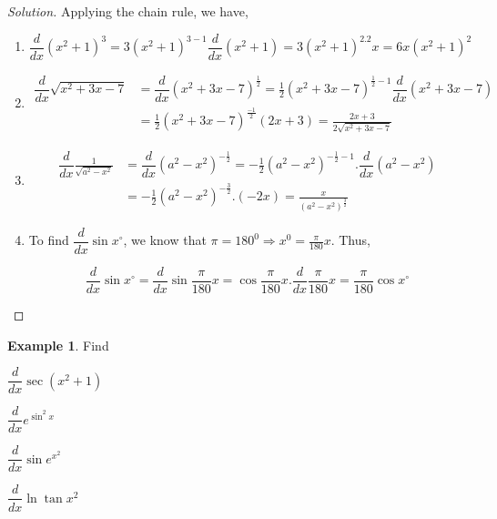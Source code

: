 \documentclass[../../main.tex]{subfiles}
\theoremstyle{definition}
\newtheorem{example}{Example}[section]
\newenvironment{solution}
    {\begin{proof}[Solution]}
    {\end{proof}}
\begin{document}
\begin{solution}
Applying the chain rule, we have,
\begin{enumerate}[label=(\roman*)]
\item 
\[
\dfrac{d}{dx} (x^2+1)^3 = 3(x^2+1)^{3-1} \dfrac{d}{dx}(x^2+1) = 3(x^2+1)^2.2x = 6x(x^2+1)^2
\]

\item 
\begin{align*}
\dfrac{d}{dx} \sqrt{{x^2+3x-7}} &= \dfrac{d}{dx} {(x^2+3x-7)^{\frac{1}{2}}} = \frac{1}{2}(x^2+3x-7)^{\frac{1}{2}-1}\dfrac{d}{dx}(x^2+3x-7) \\
&= \frac{1}{2}(x^2+3x-7)^{\frac{-1}{2}}(2x+3) = \frac{2x+3}{2\sqrt{x^2+3x-7}}
\end{align*}

\item \begin{align*}
\dfrac{d}{dx} \frac{1}{\sqrt{a^2-x^2}} &= \dfrac{d}{dx}(a^2-x^2)^{-\frac{1}{2}} = -\frac{1}{2}(a^2-x^2)^{-\frac{1}{2}-1}.\dfrac{d}{dx}(a^2-x^2) \\
&= -\frac{1}{2}(a^2-x^2)^{-\frac{3}{2}}.(-2x) = \frac{x}{(a^2-x^2)^\frac{3}{2}}
\end{align*}

\item To find $\dfrac{d}{dx}\sin x^\circ$, we know that $\pi=180^0\Rightarrow x^0=\frac{\pi}{180}x$. Thus, 

\[
\dfrac{d}{dx}\sin x^\circ = \dfrac{d}{dx}\sin \frac{\pi}{180}x = \cos \frac{\pi}{180}x.\dfrac{d}{dx}\frac{\pi}{180}x = \frac{\pi}{180}\cos x^\circ
\]
\end{enumerate}
\end{solution}

\begin{example}
Find 
\begin{enumerate*}[label=(\roman*)]
    \item $\dfrac{d}{dx} \sec (x^2+1)$
    \item $\dfrac{d}{dx} e^{\sin^2 x}$
    \item $\dfrac{d}{dx} \sin e^{x^2}$ 
    \item $\dfrac{d}{dx} \ln \tan x^2$
\end{enumerate*}
\end{example}
\end{document}
